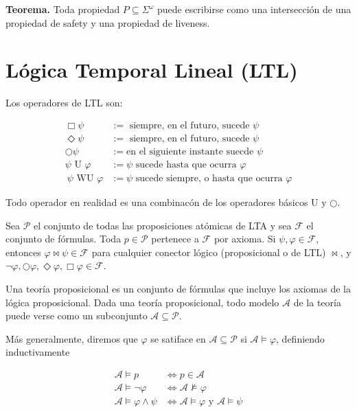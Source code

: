 \documentclass[a4paper, 12pt]{article}
\begin{document}
\textbf{Teorema.} Toda propiedad $P \subseteq \Sigma^\omega$ puede escribirse como una
intersección de una propiedad de safety y una propiedad de liveness. 


\section*{Lógica Temporal Lineal (LTL)}

Los operadores de LTL son: 

\begin{align*}
    \Box \psi &:= \text{ siempre, en el futuro, sucede $\psi$}\\ 
    \Diamond  \psi &:= \text{ siempre, en el futuro, sucede $\psi$}\\ 
    \bigcirc  \psi &:= \text{en el siguiente instante suecde } \psi \\
    \psi \text{ U } \varphi &:= \psi\text{ sucede hasta que ocurra
    }\varphi\\\
    \psi \text{ WU } \varphi &:= \psi\text{ sucede siempre, o hasta que ocurra }\varphi
\end{align*}

Todo operador en realidad es una combinacón de los operadores básicos U y
$\bigcirc $.

Sea $\mathcal{P}$ el conjunto de todas las proposiciones atómicas de LTA y sea
$\mathcal{F}$ el conjunto de fórmulas. Toda $p \in \mathcal{P}$ pertenece a
$\mathcal{F}$ por axioma. Si $\psi, \varphi \in \mathcal{F}$, entonces $\varphi
\bowtie \psi \in \mathcal{F}$ para cualquier conector lógico (proposicional o de
LTL) $\bowtie$, y $\neg
\varphi, \bigcirc \varphi, \Diamond \varphi, \Box \varphi \in \mathcal{F}$. 

Una teoría proposicional es un conjunto de fórmulas que incluye los axiomas de
la lógica proposicional. Dada una teoría proposicional, todo modelo
$\mathcal{A}$ de la teoría puede verse como un subconjunto $\mathcal{A} \subseteq
\mathcal{P}$.

Más generalmente, diremos que $\varphi$ se satiface en $\mathcal{A} \subseteq
\mathcal{P}$ si $\mathcal{A} \vDash \varphi$, definiendo inductivamente 

\begin{align*}
    \mathcal{A} \vDash p &\iff p \in \mathcal{A}\\ 
    \mathcal{A} \vDash \neg \varphi &\iff \mathcal{A} \not\vDash \varphi\\ 
    \mathcal{A} \vDash \varphi \land  \psi &\iff \mathcal{A} \vDash \varphi \text{ y } \mathcal{A}
    \vDash \psi
\end{align*}
\end{document}
